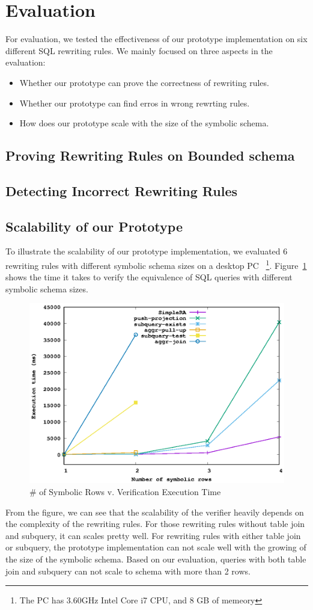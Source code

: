 \section{Evaluation}
For evaluation, we tested the effectiveness of our prototype implementation 
on six different SQL rewriting rules.
We mainly focused on three aspects in the evaluation:
\begin{itemize}
\item Whether our prototype can prove the correctness of rewriting rules.
\item Whether our prototype can find erros in wrong rewrting rules.
\item How does our prototype scale with the size of the symbolic schema.
\end{itemize}

\subsection{Proving Rewriting Rules on Bounded schema}
\subsection{Detecting Incorrect Rewriting Rules}
\subsection{Scalability of our Prototype}
To illustrate the scalability of our prototype implementation, we evaluated
6 rewriting rules with different symbolic schema sizes on a desktop PC
~\footnote{The PC has 3.60GHz Intel Core i7 CPU, and 8 GB of memeory}.
Figure~\ref{fig:scale} shows the time it takes to verify the equivalence of SQL queries
with different symbolic schema sizes.

\begin{figure}[!htb]
  \centering
  \includegraphics[width=0.7\linewidth]{scale.eps}
  \caption{\# of Symbolic Rows v. Verification Execution Time}
  \label{fig:scale}
\end{figure}

From the figure, we can see that the scalability of the verifier heavily depends 
on the complexity of the rewriting rules.
For those rewriting rules without table join and subquery, it can scales pretty well.
For rewriting rules with either table join or subquery, the prototype implementation can 
not scale well with the growing of the size of the symbolic schema.
Based on our evaluation, queries with both table join and subquery can not scale to schema with
more than 2 rows.
